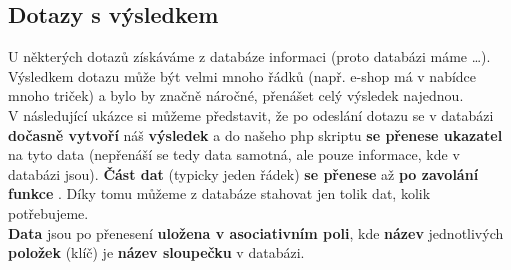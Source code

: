 \subsection{Dotazy s výsledkem}
U některých dotazů získáváme z databáze informaci (proto databázi máme \dots).\\
Výsledkem dotazu může být velmi mnoho řádků (např. e-shop má v nabídce mnoho triček) a bylo by značně náročné, přenášet celý výsledek najednou.\\
V následující ukázce si můžeme představit, že po odeslání dotazu se v databázi \textbf{dočasně vytvoří} náš \textbf{výsledek} a do našeho php skriptu \textbf{se přenese ukazatel} na tyto data (nepřenáší se tedy data samotná, ale pouze informace, kde v databázi jsou). \textbf{Část dat} (typicky jeden řádek) \textbf{se přenese} až \textbf{po zavolání funkce} . Díky tomu můžeme z databáze stahovat jen tolik dat, kolik potřebujeme.\\
\textbf{Data} jsou po přenesení \textbf{uložena v asociativním poli}, kde \textbf{název} jednotlivých \textbf{položek} (klíč) je \textbf{název sloupečku} v databázi.\\

